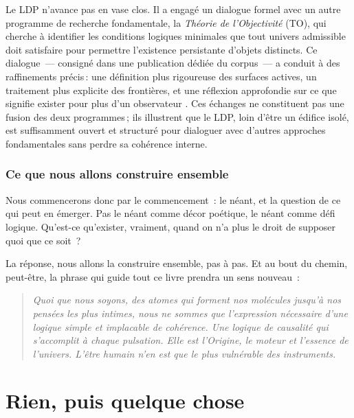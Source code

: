 \documentclass[12pt, a4paper, openright]{book}
\begin{document}
\medskip

Le LDP n'avance pas en vase clos. Il a engagé un dialogue formel avec un autre programme de recherche fondamentale, la \emph{Théorie de l'Objectivité} (TO), qui cherche à identifier les conditions logiques minimales que tout univers admissible doit satisfaire pour permettre l'existence persistante d'objets distincts. Ce dialogue~--- consigné dans une publication dédiée du corpus~--- a conduit à des raffinements précis\,: une définition plus rigoureuse des surfaces actives, un traitement plus explicite des frontières, et une réflexion approfondie sur ce que signifie \og exister pour plus d'un observateur \fg{}. Ces échanges ne constituent pas une fusion des deux programmes\,; ils illustrent que le LDP, loin d'être un édifice isolé, est suffisamment ouvert et structuré pour dialoguer avec d'autres approches fondamentales sans perdre sa cohérence interne.

\subsection*{Ce que nous allons construire ensemble}

Nous commencerons donc par le commencement~: le néant, et la question de ce qui peut en émerger. Pas le néant comme décor poétique, le néant comme défi logique. Qu'est-ce qu'exister, vraiment, quand on n'a plus le droit de supposer quoi que ce soit~?

\medskip

La réponse, nous allons la construire ensemble, pas à pas. Et au bout du chemin, peut-être, la phrase qui guide tout ce livre prendra un sens nouveau~:

\begin{quote}
\itshape Quoi que nous soyons, des atomes qui forment nos molécules jusqu'à nos pensées les plus intimes, nous ne sommes que l'expression nécessaire d'une logique simple et implacable de cohérence. Une logique de causalité qui s'accomplit à chaque pulsation. Elle est l'Origine, le moteur et l'essence de l'univers. L'être humain n'en est que le plus vulnérable des instruments.
\end{quote}



\chapter{Rien, puis quelque chose}
\end{document}
